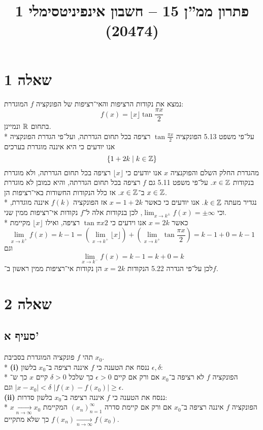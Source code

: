 

\title{פתרון ממ''ן 15 – חשבון אינפיניטסימלי 1 (20474)}


\maketitle
\section{שאלה 1}
נמצא את נקודות הרציפות והאי־רציפות של הפונקציה $f$ המוגדרת:
\[
	f(x) = \lfloor x \rfloor \tan \frac{\pi x}{2}
\]
בתחום $\mathbb{R}$ ונמיינן. \\*
על־פי משפט 5.13 הפונקציה $\tan \frac{\pi x}{2}$ רציפה בכל תחום הגדרתה, ועל־פי הגדרת הפונקציה אנו יודעים כי היא איננה מוגדרת בערכים
\[
	\left\{ 1 + 2k \mid k \in \mathbb{Z} \right\}
\]
מהגדרת החלק השלם והפוקנציה $x$ אנו יודעים כי $\lfloor x \rfloor$ רציפה בכל תחום הגדרתה, ולא מוגדרת בנקודות $x \in \mathbb{Z}$.
על־פי משפט 5.11 גם $f$ רציפה בכל תחום הגדרתה, והיא כמובן לא מוגדרת ב־$x \in \mathbb{Z}$.
אז כלל הנקודות החשודות באי־רציפות הן $x \in \mathbb{Z}$. \\*
נגדיר מעתה $k \in \mathbb{Z}$. אנו יודעים כי כאשר $x = 1 + 2k$ אז הפונקציה $f(k)$ איננה מוגדרת, וכי $\lim_{x \to k^\pm} f(x) = \pm \infty$,
לכן בנקודות אלה ל־$f$ נקודות אי־רציפות ממין שני. \\*
כאשר $x = 2k$ אנו וידעים כי $\tan{\pi x}{2}$ רציפה, ואילו $\lfloor x \rfloor$ מקיימת
\[
	\lim_{x \to k^+} f(x) = k - 1
	= \left( \lim_{x \to k^+} \lfloor x \rfloor \right) + \left( \lim_{x \to k^+} \tan \frac{\pi x}{2} \right)
	= k - 1 + 0
	= k - 1
\]
וגם
\[
	\lim_{x \to k^-} f(x) = k - 1
	= k + 0
	= k
\]
לכן על־פי הגדרה 5.22 הנקודות $x = 2k$ הן נקודות אי־רציפות ממין ראשון ב־$f$.

\section{שאלה 2}
\subsection{סעיף א'}
תהי $f$ פונקציה המוגדרת בסביבת $x_0$. \\*
\textbf{(i)}
ננסח את הטענה כי $f$ איננה רציפה ב־$x_0$ בלשון $\epsilon, \delta$: \\*
הפונקציה $f$ לא רציפה ב־$x_0$ אם ורק אם קיים $\epsilon > 0$ כך שלכל $\delta > 0$ קיים $x$ כך ש־$|x - x_0| < \delta$ וגם $|f(x) - f(x_0)| \ge \epsilon$. \\
\textbf{(ii)}
ננסח את הטענה כי $f$ איננה רציפה ב־$x_0$ בלשון סדרות: \\*
הפונקציה $f$ איננה רציפה ב־$x_0$ אם ורק אם קיימת סדרה ${(x_n)}_{n = 1}^\infty$ המקיימת $x \underset{n \to \infty}{\rightarrow} x_0$
כך שלא מתקיים $f(x_n) \underset{n \to \infty}{\rightarrow} f(x_0)$.

